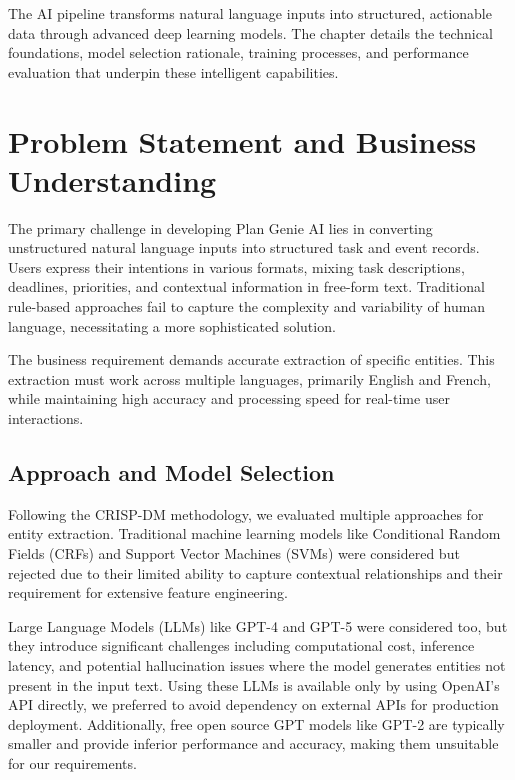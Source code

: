 \documentclass[12pt,a4paper]{article}
\begin{document}
The AI pipeline transforms natural language inputs into structured, actionable data through advanced deep learning models. The chapter details the technical foundations, model selection rationale, training processes, and performance evaluation that underpin these intelligent capabilities.

\section{Problem Statement and Business Understanding}

The primary challenge in developing Plan Genie AI lies in converting unstructured natural language inputs into structured task and event records. Users express their intentions in various formats, mixing task descriptions, deadlines, priorities, and contextual information in free-form text. Traditional rule-based approaches fail to capture the complexity and variability of human language, necessitating a more sophisticated solution.

The business requirement demands accurate extraction of specific entities. This extraction must work across multiple languages, primarily English and French, while maintaining high accuracy and processing speed for real-time user interactions.

\subsection{Approach and Model Selection}

Following the CRISP-DM methodology, we evaluated multiple approaches for entity extraction. Traditional machine learning models like Conditional Random Fields (CRFs) and Support Vector Machines (SVMs) were considered but rejected due to their limited ability to capture contextual relationships and their requirement for extensive feature engineering.

Large Language Models (LLMs) like GPT-4 and GPT-5 were considered too, but they introduce significant challenges including computational cost, inference latency, and potential hallucination issues where the model generates entities not present in the input text. Using these LLMs is available only by using OpenAI's API directly, we preferred to avoid dependency on external APIs for production deployment. Additionally, free open source GPT models like GPT-2 are typically smaller and provide inferior performance and accuracy, making them unsuitable for our requirements.
\end{document}
